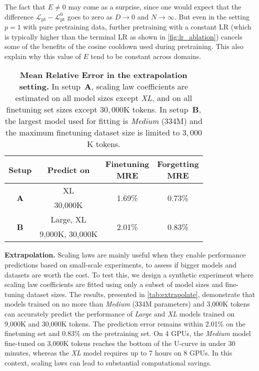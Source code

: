 The fact that $E\neq 0$ may come as a surprise, since one would expect that the difference $\mathcal{L}_{\mathrm{pt}}-\mathcal{L}_{\mathrm{pt}}^0$ goes to zero as $D\rightarrow 0$ and $N\rightarrow \infty$. But even in the setting $p=1$ with pure pretraining data, further pretraining with a constant LR (which is typically higher than the terminal LR as shown in \autoref{fig:lr_ablation}) cancels some of the benefits of the cosine cooldown used during pretraining. This also explain why this value of $E$ tend to be constant across domains.  

\begin{table}[]
    \centering
    \begin{tabular}{cc|cc}
         Setup & Predict on & \makecell{Finetuning\\ MRE} & \makecell{Forgetting\\ MRE}\\
         \toprule
          \multirow{2}{*}{\textbf{A}} & XL & \multirow{2}{*}{1.69\%} & \multirow{2}{*}{0.73\%}\\
          & 30,000K &  & \\
          \hline
          \multirow{2}{*}{\textbf{B}} & Large, XL & \multirow{2}{*}{2.01\%} & \multirow{2}{*}{0.83\%}\\
          & 9,000K, 30,000K &  & \\
    \end{tabular}
    \caption{\textbf{Mean Relative Error in the extrapolation setting.} In setup~\textbf{A}, scaling law coefficients are estimated on all model sizes except \textit{XL}, and on all finetuning set sizes except $30,000$K tokens. In setup~\textbf{B}, the largest model used for fitting is \textit{Medium} (334M) and the maximum finetuning dataset size is limited to $3,000$K tokens.}
    \label{tab:extrapolate}
\end{table}

\textbf{Extrapolation.} Scaling laws are mainly useful when they enable performance predictions based on small-scale experiments, to assess if bigger models and datasets are worth the cost. To test this, we design a synthetic experiment where scaling law coefficients are fitted using only a subset of model sizes and fine-tuning dataset sizes. The results, presented in \autoref{tab:extrapolate}, demonstrate that models trained on no more than \textit{Medium} (334M parameters) and 3,000K tokens can accurately predict the performance of \textit{Large} and \textit{XL} models trained on 9,000K and 30,000K tokens. The prediction error remains within 2.01\% on the finetuning set and 0.83\% on the pretraining set. On 4 GPUs, the \textit{Medium} model fine-tuned on 3,000K tokens reaches the bottom of the U-curve in under 30 minutes, whereas the \textit{XL} model requires up to 7 hours on 8 GPUs. In this context, scaling laws can lead to substantial computational savings.    


